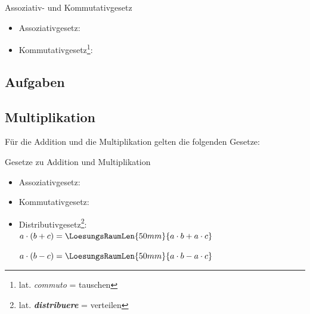 \begin{gesetz}{Assoziativ- und Kommutativgesetz}{}
 \begin{itemize}
  \item Assoziativgesetz: 
  \item Kommutativgesetz\footnote{lat. \textit{commuto} = tauschen}:
 \end{itemize}
\end{gesetz}


\subsection*{Aufgaben}


\newpage
\subsection{Multiplikation}

Für die Addition und die Multiplikation gelten die folgenden
Gesetze:



\begin{gesetz}{Gesetze zu Addition und Multiplikation}{}
\begin{itemize}
\item Assoziativgesetz: 
\item Kommutativgesetz:  
\item Distributivgesetz\footnote{lat. \textit{\textbf{distribuere}} = verteilen}:\\
  $a\cdot (b+c) = \LoesungsRaumLen{50mm}{a\cdot b + a\cdot c}$\\

  \noTRAINER{\vspace{5mm}}
  
  $a\cdot (b-c) = \LoesungsRaumLen{50mm}{a\cdot b - a\cdot c}$\\
  
  \end{itemize}
\end{gesetz}


